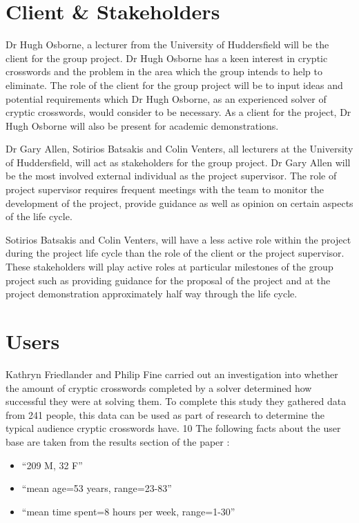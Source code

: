 \section{Client \& Stakeholders}
Dr Hugh Osborne, a lecturer from the University of Huddersfield will be 
the client for the group project. Dr Hugh Osborne has a keen interest in
 cryptic crosswords and the problem in the area which the group intends
 to help to eliminate. The role of the client for the group project will be to
 input ideas and potential requirements which Dr Hugh Osborne, as an
 experienced solver of cryptic crosswords, would consider to be necessary.
 As a client for the project, Dr Hugh Osborne will also be present for academic
 demonstrations.

Dr Gary Allen, Sotirios Batsakis and Colin Venters, all lecturers at the
 University of Huddersfield, will act as stakeholders for the group project.
 Dr Gary Allen will be the most involved external individual as the project 
supervisor. The role of project supervisor requires frequent meetings with the
 team to monitor the development of the project, provide guidance as well as 
opinion on certain aspects of the life cycle.  

Sotirios Batsakis and Colin Venters, will have a less active role within the project
 during the project life cycle than the role of the client or the project supervisor. 
These stakeholders will play active roles at particular milestones of the group 
project such as providing guidance for the proposal of the project and at the
 project demonstration approximately half way through the life cycle. 


\section{Users} 
Kathryn Friedlander and Philip Fine \citep{friedlander09} carried out an investigation into
whether the amount of cryptic crosswords completed by a solver determined how successful they
were at solving them.
To complete this study they gathered data from 241 people, this data can be used as part of
research to determine the typical audience cryptic crosswords have.
10
The following facts about the user base are taken from the results section of the paper \citep{friedlander09}:
\begin{itemize}
    \item ``209 M, 32 F''
    \item ``mean age=53 years, range=23-83''
    \item ``mean time spent=8 hours per week, range=1-30''
\end{itemize}

